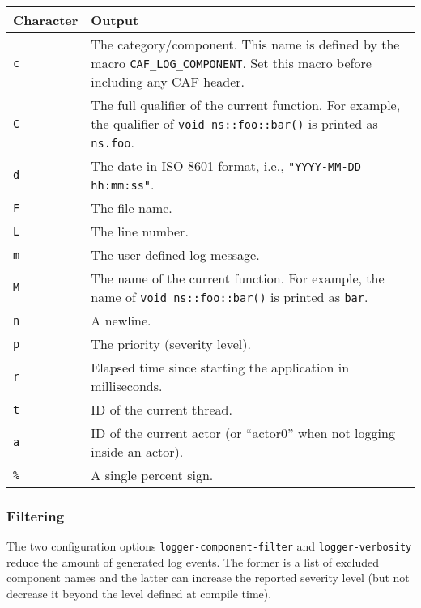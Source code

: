 \begin{tabular}{|p{}|p{}|}
  \hline
  \textbf{Character} & \textbf{Output} \\
  \hline
  \texttt{c} & The category/component. This name is defined by the macro \lstinline^CAF_LOG_COMPONENT^. Set this macro before including any CAF header. \\
  \hline
  \texttt{C} & The full qualifier of the current function. For example, the qualifier of \lstinline^void ns::foo::bar()^ is printed as \lstinline^ns.foo^. \\
  \hline
  \texttt{d} & The date in ISO 8601 format, i.e., \lstinline^"YYYY-MM-DD hh:mm:ss"^. \\
  \hline
  \texttt{F} & The file name. \\
  \hline
  \texttt{L} & The line number. \\
  \hline
  \texttt{m} & The user-defined log message. \\
  \hline
  \texttt{M} & The name of the current function. For example, the name of \lstinline^void ns::foo::bar()^ is printed as \lstinline^bar^. \\
  \hline
  \texttt{n} & A newline. \\
  \hline
  \texttt{p} & The priority (severity level). \\
  \hline
  \texttt{r} & Elapsed time since starting the application in milliseconds. \\
  \hline
  \texttt{t} & ID of the current thread. \\
  \hline
  \texttt{a} & ID of the current actor (or ``actor0'' when not logging inside an actor). \\
  \hline
  \texttt{\%} & A single percent sign. \\
  \hline
\end{tabular}

\subsubsection{Filtering}
\label{log-output-filtering}

The two configuration options \lstinline^logger-component-filter^ and
\lstinline^logger-verbosity^ reduce the amount of generated log events. The
former is a list of excluded component names and the latter can increase the
reported severity level (but not decrease it beyond the level defined at
compile time).
